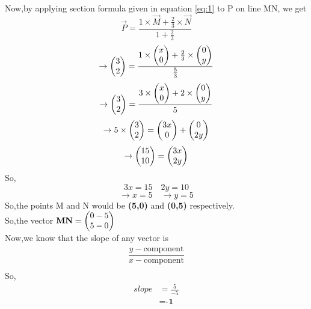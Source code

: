 \documentclass[journal,12pt,twocolumn]{IEEEtran}
\begin{document}
Now,by applying section formula given in equation \eqref{eq:1} to P on line MN, we get\\
\begin{equation*}
    \vec{P}=\frac{1\times \vec{M}+\frac{2}{3}\times \vec{N}}{1+\frac{2}{3}}
\end{equation*}
\begin{equation*}
    \rightarrow\begin{pmatrix}3 \\ 2\end{pmatrix}=\frac{1\times \begin{pmatrix}x\\0\end{pmatrix}+\frac{2}{3}\times \begin{pmatrix}0\\y\end{pmatrix}}{\frac{5}{3}}
\end{equation*}
\begin{equation*}
\rightarrow\begin{pmatrix}3 \\ 2\end{pmatrix}=\frac{3\times \begin{pmatrix}x\\0\end{pmatrix}+2\times \begin{pmatrix}0\\y\end{pmatrix}}{5}
\end{equation*}
\begin{equation*}
    \rightarrow 5\times \begin{pmatrix}3\\2\end{pmatrix}=\begin{pmatrix}3x\\0\end{pmatrix}+\begin{pmatrix}0\\2y\end{pmatrix}
\end{equation*}
\begin{equation}
\rightarrow\begin{pmatrix}15\\10\end{pmatrix}=\begin{pmatrix}3x\\2y\end{pmatrix}  \nonumber
\end{equation}
So,
\begin{equation*}
3x=15\quad 2y=10
\end{equation*}
\begin{equation}
\rightarrow x=5\quad \rightarrow y=5       \nonumber
\end{equation}
So,the points M and N would be \textbf{(5,0)} and \textbf{(0,5)} respectively.\\

So,the vector $\mathbf{MN}=\begin{pmatrix}0-5\\5-0\end{pmatrix}$\\

Now,we know that the slope of any vector is
\begin{align}
    \dfrac{y-\text{component}}{x-\text{component}}   \nonumber \\ \nonumber
\end{align}
So,
 \begin{align}
  slope &=\frac{5}{-5}             \nonumber        \\     
  &=\textbf{-1}                    \nonumber
\end{align}
\end{document}
